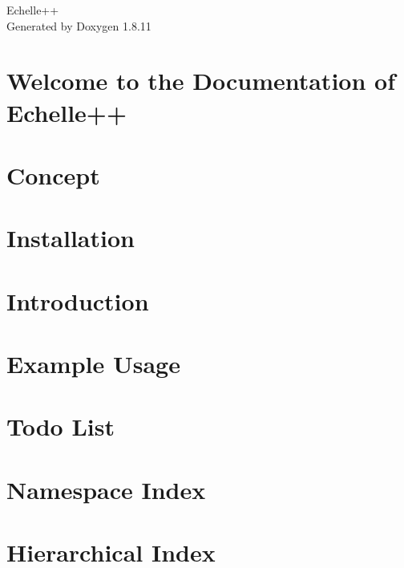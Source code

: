 \documentclass[twoside]{book}
\newcommand{\+}{\discretionary{\mbox{\scriptsize$\hookleftarrow$}}{}{}}
\newcommand{\clearemptydoublepage}{%
  \newpage{\pagestyle{empty}\cleardoublepage}%
}
\begin{document}
\hypersetup{pageanchor=false,
             bookmarksnumbered=true,
             pdfencoding=unicode
            }
\begin{titlepage}
\vspace*{7cm}
\begin{center}%
{\Large Echelle++ }\\
\vspace*{1cm}
{\large Generated by Doxygen 1.8.11}\\
\end{center}
\end{titlepage}
\clearemptydoublepage
\tableofcontents
\clearemptydoublepage
{}
\hypersetup{pageanchor=true}

\chapter{Welcome to the Documentation of Echelle++}
\label{index}\hypertarget{index}{}
\chapter{Concept}
\label{concept}
\hypertarget{concept}{}

\chapter{Installation}
\label{installation}
\hypertarget{installation}{}

\chapter{Introduction}
\label{intro}
\hypertarget{intro}{}

\chapter{Example Usage}
\label{usage}
\hypertarget{usage}{}

\chapter{Todo List}
\label{todo}
\hypertarget{todo}{}

\chapter{Namespace Index}

\chapter{Hierarchical Index}

\end{document}
